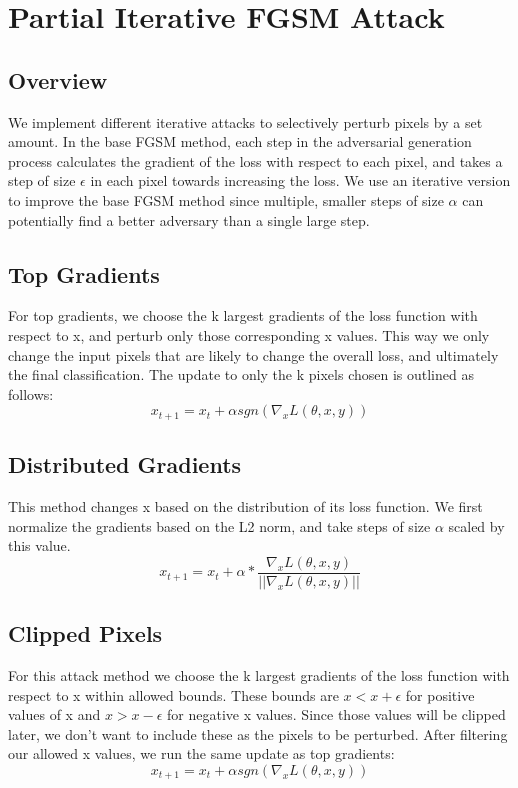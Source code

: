 \section{Partial Iterative FGSM Attack}
\subsection{Overview}
We implement different iterative attacks to selectively perturb pixels by a set amount. In the base FGSM method, each step in the adversarial generation process calculates the gradient of the loss with respect to each pixel, and takes a step of size $\epsilon$ in each pixel towards increasing the loss. We use an iterative version to improve the base FGSM method since multiple, smaller steps of size $\alpha$ can potentially find a better adversary than a single large step. 
\subsection{Top Gradients}
For top gradients, we choose the k largest gradients of the loss function with respect to x, and perturb only those corresponding x values. This way we only change the input pixels that are likely to change the overall loss, and ultimately the final classification. The update to only the k pixels chosen is outlined as follows:
$$x_{t+1} = x_t + \alpha sgn(\nabla_xL(\theta,x,y))$$

\subsection{Distributed Gradients}
This method changes x based on the distribution of its loss function. We first normalize the gradients based on the L2 norm, and take steps of size $\alpha$ scaled by this value.
$$ x_{t+1} = x_t + \alpha * \frac {\nabla_xL(\theta,x,y)} {||\nabla_xL(\theta,x,y)||} $$

\subsection{Clipped Pixels}
For this attack method we choose the k largest gradients of the loss function with respect to x within allowed bounds. These bounds are $x < x + \epsilon$ for positive values of x and $x > x - \epsilon$ for negative x values. Since those values will be clipped later, we don't want to include these as the pixels to be perturbed. After filtering our allowed x values, we run the same update as top gradients:
$$x_{t+1} = x_t + \alpha sgn(\nabla_xL(\theta,x,y))$$